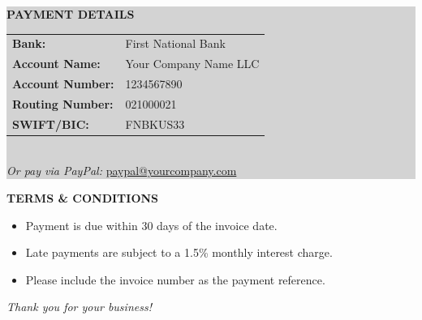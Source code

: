 \documentclass[11pt,a4paper]{article}
\begin{document}
\colorbox{lightgray}{%
\begin{minipage}{\dimexpr\textwidth-2\fboxsep}
    \vspace{8pt}
    \textcolor{accentblue}{\textbf{PAYMENT DETAILS}}\\[4pt]
    \begin{tabular}{ll}
        \textbf{Bank:} & First National Bank \\
        \textbf{Account Name:} & Your Company Name LLC \\
        \textbf{Account Number:} & 1234567890 \\
        \textbf{Routing Number:} & 021000021 \\
        \textbf{SWIFT/BIC:} & FNBKUS33 \\
    \end{tabular}\\[8pt]
    \textit{Or pay via PayPal:} \url{paypal@yourcompany.com}
    \vspace{8pt}
\end{minipage}%
}

\vspace{16pt}

\textcolor{accentblue}{\textbf{TERMS \& CONDITIONS}}

\begin{itemize}
    \setlength{\itemsep}{2pt}
    \item Payment is due within 30 days of the invoice date.
    \item Late payments are subject to a 1.5\% monthly interest charge.
    \item Please include the invoice number as the payment reference.
\end{itemize}

\vspace{12pt}
\textit{Thank you for your business!}
\end{document}
